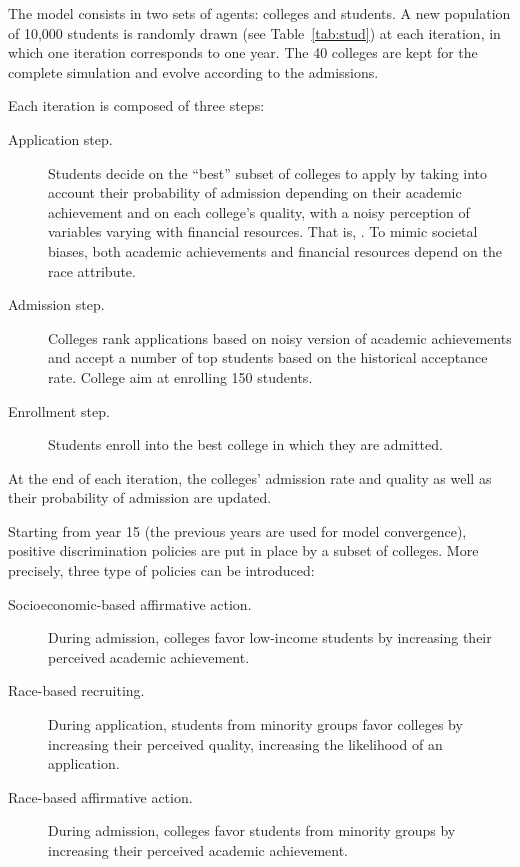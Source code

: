 The model consists in two sets of agents: colleges and students.
A new population of 10,000 students is randomly drawn (see Table~\ref{tab:stud}) at each iteration, in which one iteration corresponds to one year.
The 40 colleges are kept for the complete simulation and evolve according to the admissions.

Each iteration is composed of three steps:

\begin{description}

\item[Application step.] Students decide on the ``best'' subset of colleges to apply by taking into account their probability of admission depending on their academic achievement and on each college's quality, with a noisy perception of variables varying with financial resources. That is, .
To mimic societal biases, both academic achievements and financial resources depend on the race attribute.

\item[Admission step.] Colleges rank applications based on noisy version of academic achievements and accept a number of top students based on the historical acceptance rate. College aim at enrolling 150 students.

\item[Enrollment step.] Students enroll into the best college in which they are admitted.

\end{description}

At the end of each iteration, the colleges' admission rate and quality as well as their probability of admission are updated.

Starting from year 15 (the previous years are used for model
convergence), positive discrimination policies are put in place by a subset of colleges.
More precisely, three type of policies can be introduced:

\begin{description}

\item[Socioeconomic-based affirmative action.] During admission, colleges favor low-income students by increasing their perceived academic achievement.

\item[Race-based recruiting.] During application, students from minority groups favor colleges by increasing their perceived quality, increasing the likelihood of an application.

\item[Race-based affirmative action.] During admission, colleges favor students from minority groups by increasing their perceived academic achievement.

\end{description}

